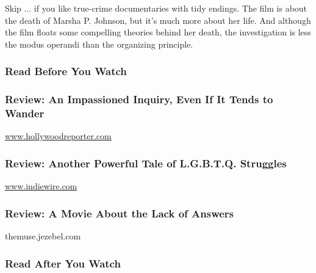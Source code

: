 Skip ... if you like true-crime documentaries with tidy endings. The
film is about the death of Marsha P. Johnson, but it's much more about
her life. And although the film floats some compelling theories behind
her death, the investigation is less the modus operandi than the
organizing principle.

\hypertarget{read-before-you-watch}{%
\subsubsection{Read Before You Watch}\label{read-before-you-watch}}

\href{http://www.hollywoodreporter.com/review/death-life-marsha-p-johnson-tribeca-2017-996386}{}

\hypertarget{review-an-impassioned-inquiry-even-if-it-tends-to-wander}{%
\subsubsection{Review: An Impassioned Inquiry, Even If It Tends to
Wander}\label{review-an-impassioned-inquiry-even-if-it-tends-to-wander}}

\href{http://www.hollywoodreporter.com}{www.hollywoodreporter.com}

\href{http://www.indiewire.com/2017/04/the-death-and-life-of-marsha-p-johnson-review-tribeca-2017-1201808593/}{}

\hypertarget{review-another-powerful-tale-of-lgbtq-struggles}{%
\subsubsection{Review: Another Powerful Tale of L.G.B.T.Q.
Struggles}\label{review-another-powerful-tale-of-lgbtq-struggles}}

\href{http://www.indiewire.com}{www.indiewire.com}

\href{http://themuse.jezebel.com/the-death-and-life-of-marsha-p-johnson-examines-the-co-1794590726}{}

\hypertarget{review-a-movie-about-the-lack-of-answers}{%
\subsubsection{Review: A Movie About the Lack of
Answers}\label{review-a-movie-about-the-lack-of-answers}}

themuse.jezebel.com

\hypertarget{read-after-you-watch}{%
\subsubsection{Read After You Watch}\label{read-after-you-watch}}

